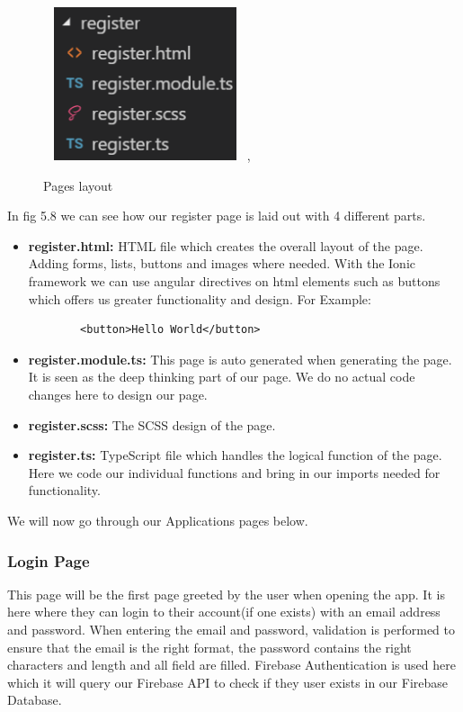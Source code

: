 \documentclass[12pt,a4paper,oneside,openany]{book}
\begin{document}
\begin{figure}[ht]
\renewcommand\thefigure{5.8}
\centering
\includegraphics[width=6cm,height=4.5cm]{Images/pages.png},
\caption{Pages layout}
\label{pages}
\end{figure}

In fig 5.8 we can see how our register page is laid out with 4 different parts.

\begin{itemize}
    \item \textbf{register.html:} HTML file which creates the overall layout of the page. Adding forms, lists, buttons and images where needed. With the Ionic framework we can use angular directives on html elements such as buttons which oﬀers us greater functionality and design. For Example:
    \begin{verbatim}
        <button>Hello World</button>
    \end{verbatim}
    \item \textbf{register.module.ts:} This page is auto generated when generating the page. It is seen as the deep thinking part of our page. We do no actual code changes here to design our page.
    \item \textbf{register.scss:} The SCSS design of the page.
    \item \textbf{register.ts:} TypeScript ﬁle which handles the logical function of the page. Here we code our individual functions and bring in our imports needed for functionality.
\end{itemize}

We will now go through our Applications pages below.

\subsubsection{Login Page}

This page will be the first page greeted by the user when opening the app. It is here where they can login to their account(if one exists) with an email address and password. When entering the email and password, validation is performed to ensure that the email is the right format, the password contains the right characters and length and all ﬁeld are ﬁlled. Firebase Authentication is used here which it will query our Firebase API to check if they user exists in our Firebase Database.
\end{document}
